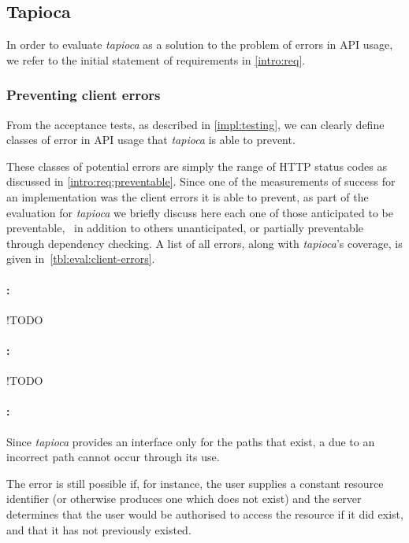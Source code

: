 \subsection{Tapioca} \label{eval:tapioca}

In order to evaluate \emph{tapioca} as a solution to the problem of errors in API usage, we refer to the initial statement of requirements in \ref{intro:req}.

\subsubsection{Preventing client errors} \label{eval:tapioca:prevent}

From the acceptance tests, as described in \cref{impl:testing}, we can clearly define classes of error in API usage that \emph{tapioca} is able to prevent.

These classes of potential errors are simply the  range of HTTP status codes as discussed in \cref{intro:req:preventable}. Since one of the measurements of success for an implementation was the client errors it is able to prevent, as part of the evaluation for \emph{tapioca} we briefly discuss here each one of those anticipated to be preventable,~ in addition to others unanticipated, or partially preventable through dependency checking. A list of all  errors, along with \emph{tapioca}'s coverage, is given in~\cref{tbl:eval:client-errors}.

\paragraph{:} !TODO

\paragraph{:} !TODO

\paragraph{:} Since \emph{tapioca} provides an interface only for the paths that exist, a  due to an incorrect path cannot occur through its use.

The error is still possible if, for instance, the user supplies a constant resource identifier (or otherwise produces one which does not exist) and the server determines that the user would be authorised to access the resource if it did exist, and that it has not previously existed.

